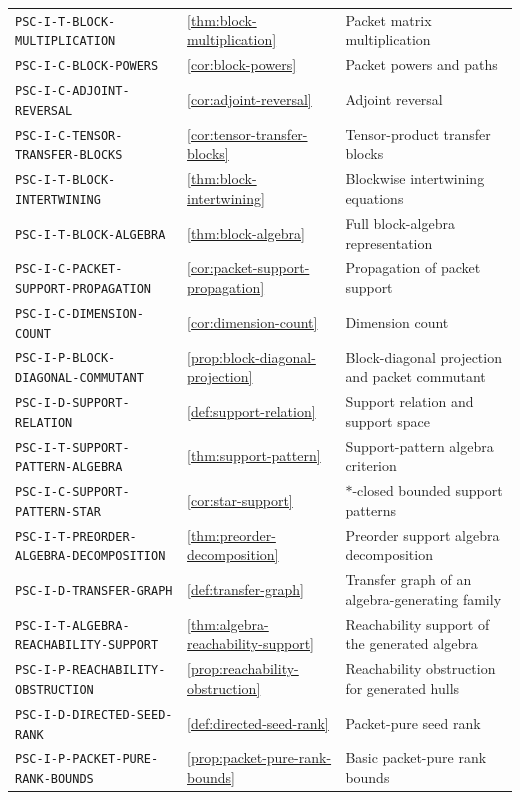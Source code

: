 \documentclass[11pt]{article}
\theoremstyle{definition}
\theoremstyle{remark}
\theoremstyle{definition}\newtheorem{example}[theorem]{Example}
\begin{document}
\begin{longtable}{@{}p{}p{}p{}@{}}
\nolinkurl{PSC-I-T-BLOCK-MULTIPLICATION} & \ref{thm:block-multiplication} & Packet matrix multiplication \\
\nolinkurl{PSC-I-C-BLOCK-POWERS} & \ref{cor:block-powers} & Packet powers and paths \\
\nolinkurl{PSC-I-C-ADJOINT-REVERSAL} & \ref{cor:adjoint-reversal} & Adjoint reversal \\
\nolinkurl{PSC-I-C-TENSOR-TRANSFER-BLOCKS} & \ref{cor:tensor-transfer-blocks} & Tensor-product transfer blocks \\
\nolinkurl{PSC-I-T-BLOCK-INTERTWINING} & \ref{thm:block-intertwining} & Blockwise intertwining equations \\
\nolinkurl{PSC-I-T-BLOCK-ALGEBRA} & \ref{thm:block-algebra} & Full block-algebra representation \\
\nolinkurl{PSC-I-C-PACKET-SUPPORT-PROPAGATION} & \ref{cor:packet-support-propagation} & Propagation of packet support \\
\nolinkurl{PSC-I-C-DIMENSION-COUNT} & \ref{cor:dimension-count} & Dimension count \\
\nolinkurl{PSC-I-P-BLOCK-DIAGONAL-COMMUTANT} & \ref{prop:block-diagonal-projection} & Block-diagonal projection and packet commutant \\
\nolinkurl{PSC-I-D-SUPPORT-RELATION} & \ref{def:support-relation} & Support relation and support space \\
\nolinkurl{PSC-I-T-SUPPORT-PATTERN-ALGEBRA} & \ref{thm:support-pattern} & Support-pattern algebra criterion \\
\nolinkurl{PSC-I-C-SUPPORT-PATTERN-STAR} & \ref{cor:star-support} & $*$-closed bounded support patterns \\
\nolinkurl{PSC-I-T-PREORDER-ALGEBRA-DECOMPOSITION} & \ref{thm:preorder-decomposition} & Preorder support algebra decomposition \\
\nolinkurl{PSC-I-D-TRANSFER-GRAPH} & \ref{def:transfer-graph} & Transfer graph of an algebra-generating family \\
\nolinkurl{PSC-I-T-ALGEBRA-REACHABILITY-SUPPORT} & \ref{thm:algebra-reachability-support} & Reachability support of the generated algebra \\
\nolinkurl{PSC-I-P-REACHABILITY-OBSTRUCTION} & \ref{prop:reachability-obstruction} & Reachability obstruction for generated hulls \\
\nolinkurl{PSC-I-D-DIRECTED-SEED-RANK} & \ref{def:directed-seed-rank} & Packet-pure seed rank \\
\nolinkurl{PSC-I-P-PACKET-PURE-RANK-BOUNDS} & \ref{prop:packet-pure-rank-bounds} & Basic packet-pure rank bounds \\

\end{longtable}
\end{document}
